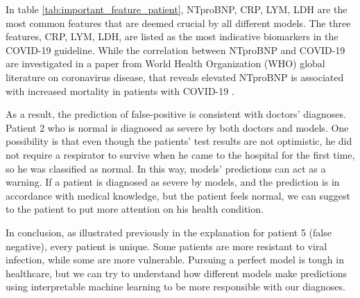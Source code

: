 

In table \ref{tab:important_feature_patient}, NTproBNP, CRP, LYM, LDH are the most common features that are deemed crucial by all different models. The three features, CRP, LYM, LDH, are listed as the most indicative biomarkers in the COVID-19 guideline. While the correlation between NTproBNP and COVID-19 are investigated in a paper from World Health Organization (WHO) global literature on coronavirus disease, that reveals elevated NTproBNP is associated with increased mortality in patients with COVID-19 \cite{Pranata387}.

As a result, the prediction of false-positive is consistent with doctors' diagnoses. Patient 2 who is normal is diagnosed as severe by both doctors and models. One possibility is that even though the patients' test results are not optimistic, he did not require a respirator to survive when he came to the hospital for the first time, so he was classified as normal. In this way, models' predictions can act as a warning. If a patient is diagnosed as severe by models, and the prediction is in accordance with medical knowledge, but the patient feels normal, we can suggest to the patient to put more attention on his health condition.

In conclusion, as illustrated previously in the explanation for patient 5 (false negative), every patient is unique. Some patients are more resistant to viral infection, while some are more vulnerable. Pursuing a perfect model is tough in healthcare, but we can try to understand how different models make predictions using interpretable machine learning to be more responsible with our diagnoses.
\color{black}

